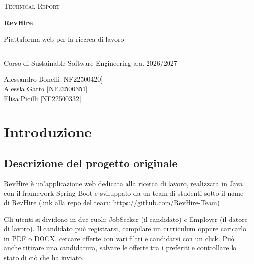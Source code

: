 \documentclass[12pt,a4paper]{article}
\begin{document}
    \begin{titlepage}
        \centering
        \vspace*{3cm}
        {\small\scshape Technical Report\par}
        \vspace{1cm}
        {\fontsize{40}{44}\selectfont\bfseries\color{primary} RevHire\par}
        \vspace{0.4cm}
        {\Large Piattaforma web per la ricerca di lavoro\par}
        \vspace{0.8cm}
        {\color{primary}\rule{0.5\textwidth}{0.8pt}\par}
        \vspace{0.8cm}
        {\large Corso di Sustainable Software Engineering a.a. 2026/2027\par}
        \vfill
        {\large
        Alessandro Bonelli [NF22500420]\\[0.3em]
        Alessia Gatto [NF22500351]\\[0.3em]
        Elisa Picilli [NF22500332]\par}
        \vspace*{3cm}
    \end{titlepage}

    \tableofcontents
    \newpage

    \section{Introduzione}

    \subsection{Descrizione del progetto originale}
    RevHire è un'applicazione web dedicata alla ricerca di lavoro, realizzata in
    Java con il framework Spring Boot e sviluppato da un team di studenti sotto il nome di
    RevHire (link alla repo del team: \url{https://github.com/RevHire-Team})

    Gli utenti si dividono in due ruoli: JobSeeker (il candidato) e Employer (il datore di lavoro).
    Il candidato può registrarsi, compilare
    un curriculum oppure caricarlo in PDF o DOCX, cercare offerte
    con vari filtri e candidarsi con un click. Può anche ritirare una candidatura,
    salvare le offerte tra i preferiti e controllare lo stato di ciò che ha
    inviato.
\end{document}
